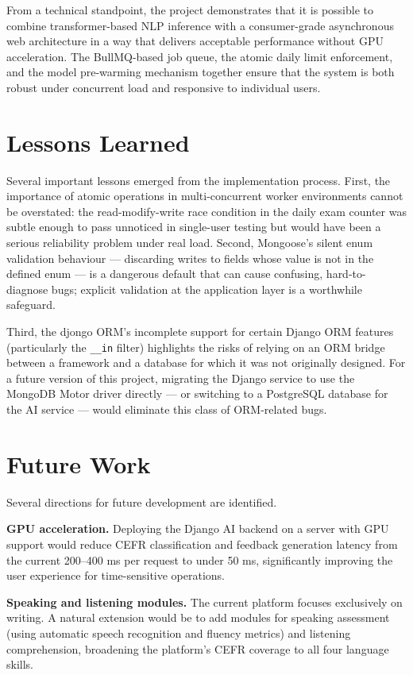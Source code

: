 \documentclass[12pt, a4paper]{report}
\begin{document}
From a technical standpoint, the project demonstrates that it is possible to combine transformer-based NLP inference with a consumer-grade asynchronous web architecture in a way that delivers acceptable performance without GPU acceleration. The BullMQ-based job queue, the atomic daily limit enforcement, and the model pre-warming mechanism together ensure that the system is both robust under concurrent load and responsive to individual users.

\section{Lessons Learned}

Several important lessons emerged from the implementation process. First, the importance of atomic operations in multi-concurrent worker environments cannot be overstated: the read-modify-write race condition in the daily exam counter was subtle enough to pass unnoticed in single-user testing but would have been a serious reliability problem under real load. Second, Mongoose's silent enum validation behaviour — discarding writes to fields whose value is not in the defined enum — is a dangerous default that can cause confusing, hard-to-diagnose bugs; explicit validation at the application layer is a worthwhile safeguard.

Third, the djongo ORM's incomplete support for certain Django ORM features (particularly the \texttt{\_\_in} filter) highlights the risks of relying on an ORM bridge between a framework and a database for which it was not originally designed. For a future version of this project, migrating the Django service to use the MongoDB Motor driver directly — or switching to a PostgreSQL database for the AI service — would eliminate this class of ORM-related bugs.

\section{Future Work}

Several directions for future development are identified.

\textbf{GPU acceleration.} Deploying the Django AI backend on a server with GPU support would reduce CEFR classification and feedback generation latency from the current 200--400 ms per request to under 50 ms, significantly improving the user experience for time-sensitive operations.

\textbf{Speaking and listening modules.} The current platform focuses exclusively on writing. A natural extension would be to add modules for speaking assessment (using automatic speech recognition and fluency metrics) and listening comprehension, broadening the platform's CEFR coverage to all four language skills.
\end{document}
